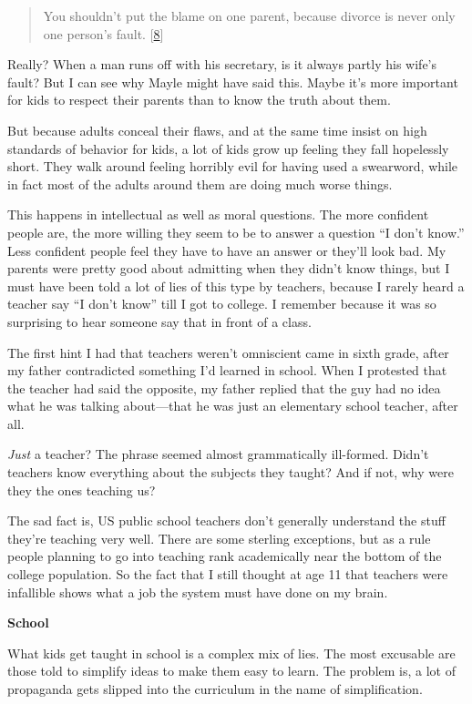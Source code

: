 \begin{quote}
You shouldn't put the blame on one parent, because divorce is never only
one person's fault. {[}\hyperref[f8n]{8}{]}
\end{quote}

Really? When a man runs off with his secretary, is it always partly his
wife's fault? But I can see why Mayle might have said this. Maybe it's
more important for kids to respect their parents than to know the truth
about them.

But because adults conceal their flaws, and at the same time insist on
high standards of behavior for kids, a lot of kids grow up feeling they
fall hopelessly short. They walk around feeling horribly evil for having
used a swearword, while in fact most of the adults around them are doing
much worse things.

This happens in intellectual as well as moral questions. The more
confident people are, the more willing they seem to be to answer a
question ``I don't know.'' Less confident people feel they have to have
an answer or they'll look bad. My parents were pretty good about
admitting when they didn't know things, but I must have been told a lot
of lies of this type by teachers, because I rarely heard a teacher say
``I don't know'' till I got to college. I remember because it was so
surprising to hear someone say that in front of a class.

The first hint I had that teachers weren't omniscient came in sixth
grade, after my father contradicted something I'd learned in school.
When I protested that the teacher had said the opposite, my father
replied that the guy had no idea what he was talking about---that he was
just an elementary school teacher, after all.

\emph{Just} a teacher? The phrase seemed almost grammatically
ill-formed. Didn't teachers know everything about the subjects they
taught? And if not, why were they the ones teaching us?

The sad fact is, US public school teachers don't generally understand
the stuff they're teaching very well. There are some sterling
exceptions, but as a rule people planning to go into teaching rank
academically near the bottom of the college population. So the fact that
I still thought at age 11 that teachers were infallible shows what a job
the system must have done on my brain.

\textbf{School}

What kids get taught in school is a complex mix of lies. The most
excusable are those told to simplify ideas to make them easy to learn.
The problem is, a lot of propaganda gets slipped into the curriculum in
the name of simplification.

